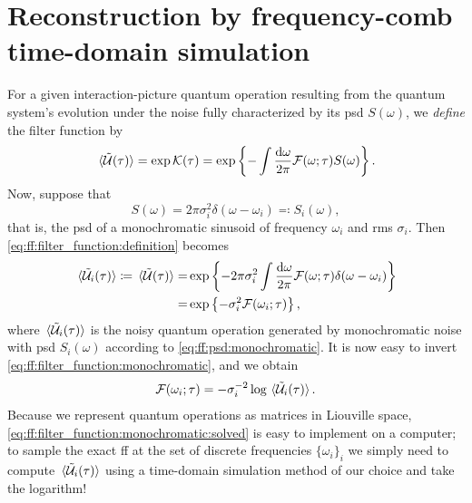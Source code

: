 \section{Reconstruction by frequency-comb time-domain simulation}\label{sec:ff:validation:method}
For a given interaction-picture quantum operation \liouvUetavg resulting from the quantum system's evolution under the noise fully characterized by its \gls{psd} $S(\omega)$, we \emph{define} the filter function \FFot by
\begin{align}\label{eq:ff:filter_function:definition}
    \liouvUetavg = \exp\cumulantfun(\tau) = \exp\left\{-\int\frac{\dd{\omega}}{2\pi}\FFot S(\omega)\right\}.
\end{align}
Now, suppose that
\begin{equation}\label{eq:ff:psd:monochromatic}
    S(\omega) = 2\pi\sigma_i^2 \delta(\omega - \omega_i) \eqqcolon S_i(\omega),
\end{equation}
that is, the \gls{psd} of a monochromatic sinusoid of frequency $\omega_i$ and \gls{rms} $\sigma_i$.
Then \cref{eq:ff:filter_function:definition} becomes
\begin{align}
    \ev*{\liouvUe_i(\tau)} \coloneqq \liouvUetavg =& \exp\left\lbrace -2\pi\sigma_i^2\int\frac{\dd{\omega}}{2\pi}\FFot\delta(\omega - \omega_i)\right\rbrace \\
                                                  =& \exp\left\lbrace -\sigma_i^2\mc{F}(\omega_i;\tau)\right\rbrace, \label{eq:ff:filter_function:monochromatic}
\end{align}
where $\ev*{\liouvUe_i(\tau)}$ is the noisy quantum operation generated by monochromatic noise with \gls{psd} $S_i(\omega)$ according to \cref{eq:ff:psd:monochromatic}.
It is now easy to invert \cref{eq:ff:filter_function:monochromatic}, and we obtain
\begin{align}\label{eq:ff:filter_function:monochromatic:solved}
    \mc{F}(\omega_i; \tau) = -\sigma_i^{-2}\log\ev*{\liouvUe_i(\tau)}.
\end{align}
Because we represent quantum operations as matrices in Liouville space, \cref{eq:ff:filter_function:monochromatic:solved} is easy to implement on a computer; to sample the exact \gls{ff} at the set of discrete frequencies $\lbrace\omega_i\rbrace_i$ we simply need to compute $\ev*{\liouvUe_i(\tau)}$  using a time-domain simulation method of our choice and take the logarithm!

